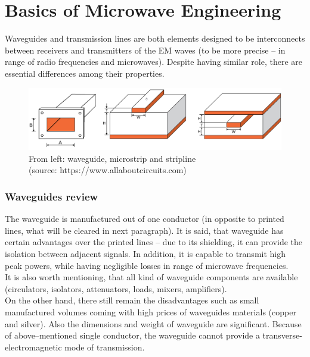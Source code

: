 \documentclass[a4paper, 11pt]{report}
\begin{document}
\section{Basics of Microwave Engineering}
Waveguides and transmission lines are both elements designed to be interconnects between receivers and transmitters of the EM waves (to be more precise -- in range of radio frequencies and microwaves). Despite having similar role, there are essential differences among their properties.

\begin{figure}[h]
	\centering
	\includegraphics[width=0.8\linewidth]{technology}
	\caption{From left: waveguide, microstrip and stripline\\ (source: https://www.allaboutcircuits.com)}
	\label{fig:technology}
\end{figure}

	

\subsubsection{Waveguides review }
The waveguide is manufactured out of one conductor (in opposite to printed lines, what will be cleared in next paragraph). It is said, that waveguide has certain advantages over the printed lines
-- due to its shielding, it can provide the isolation between adjacent signals. In addition, it is capable to transmit high peak powers, while having negligible losses in range of microwave frequencies.\\
It is also worth mentioning, that all kind of waveguide components are available (circulators, isolators, attenuators, loads, mixers, amplifiers).
\\
On the other hand, there still remain the disadvantages such as small manufactured volumes coming with high prices of waveguides materials (copper and silver). Also the dimensions and weight of waveguide are significant. Because of above--mentioned single conductor, the waveguide cannot provide a transverse-electromagnetic mode of transmission.
\end{document}
